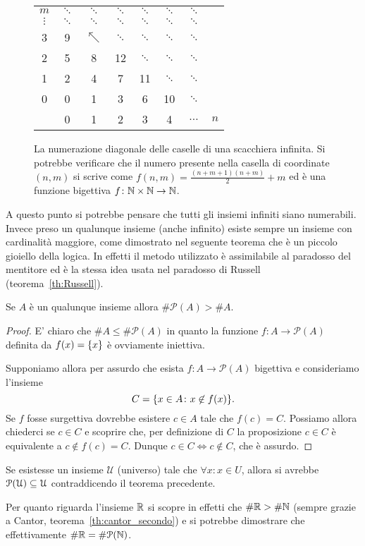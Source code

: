 \begin{figure}
  \begin{tabular}{c|ccccccc}
   $m$ & $\ddots$ & $\ddots$ & $\ddots$ & $\ddots$ & $\ddots$ & $\ddots$\\
   $\vdots$ & $\ddots$ & $\ddots$ & $\ddots$ & $\ddots$ & $\ddots$ & $\ddots$\\
   3 & 9 & $\nwarrow$ & $\ddots$  & $\ddots$ & $\ddots$ & $\ddots$\\
   2 & 5 & 8 & 12 & $\ddots$  & $\ddots$ & $\ddots$\\
   1 & 2 & 4 & 7 & 11 & $\ddots$  & $\ddots$\\
   0 & 0 & 1 & 3 & 6 & 10 & $\ddots$ \\ \hline
     & 0 & 1 & 2 & 3 & 4 & $\dots$ & $n$
  \end{tabular}
  \caption{
    La numerazione diagonale delle caselle
    di una scacchiera infinita. Si potrebbe verificare
    che il numero presente nella casella di coordinate $(n,m)$
    si scrive come $f(n,m) = \frac{(n+m+1)(n+m)}{2}+m$
    ed è una funzione bigettiva $f\colon \NN\times\NN \to\NN$.}
  \label{fig:cantor1}
\end{figure}

A questo punto si potrebbe pensare che
tutti gli insiemi infiniti siano numerabili.
Invece preso un qualunque insieme (anche infinito)
esiste sempre un insieme con cardinalità maggiore,
come dimostrato nel seguente teorema che è un piccolo gioiello della logica.
In effetti il metodo utilizzato è assimilabile al paradosso del mentitore 
ed è la stessa idea usata nel paradosso di Russell (teorema~\ref{th:Russell}).
%
%
\begin{theorem}[Cantor]%
\label{th:Cantor}%
  Se $A$ è un qualunque insieme allora $\# \mathcal P(A) > \# A$.
\end{theorem}
%
\begin{proof}
  E' chiaro che $\# A \le \#\mathcal P(A)$ in quanto 
  la funzione $f\colon A \to \mathcal P(A)$ definita da $f(x)=\ENCLOSE{x}$
  è ovviamente iniettiva.

  Supponiamo allora per assurdo che esista $f\colon A\to \mathcal P(A)$
  bigettiva e consideriamo l'insieme 
  \[
    C = \ENCLOSE{x\in A \colon x\not\in f(x)}.  
  \]
  Se $f$ fosse surgettiva dovrebbe esistere $c\in A$ tale che $f(c) = C$.
  Possiamo allora chiederci se $c\in C$ e scoprire che, 
  per definizione di $C$ la proposizione $c\in C$ è equivalente 
  a $c\not\in f(c) = C$. 
  Dunque $c\in C \iff c\not\in C$, che è assurdo.
\end{proof}
%
\begin{corollary}
  Se esistesse un insieme $\mathcal U$ (universo) 
  tale che $\forall x\colon x \in U$, allora 
  si avrebbe $\mathcal \P(\mathcal U) \subset \mathcal U$
  contraddicendo il teorema precedente.
\end{corollary}
%
Per quanto riguarda l'insieme $\RR$ si
scopre in effetti che $\#\RR > \#\NN$
(sempre grazie a Cantor, teorema~\ref{th:cantor_secondo})
e si potrebbe dimostrare che effettivamente $\#\RR = \#\mathcal P(\NN)$.


